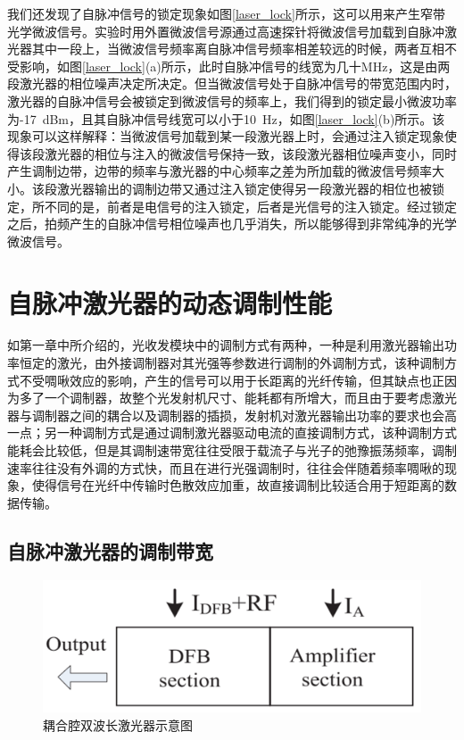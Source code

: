 我们还发现了自脉冲信号的锁定现象如图\ref{laser_lock}所示，这可以用来产生窄带光学微波信号。实验时用外置微波信号源通过高速探针将微波信号加载到自脉冲激光器其中一段上，当微波信号频率离自脉冲信号频率相差较远的时候，两者互相不受影响，如图\ref{laser_lock}(a)所示，此时自脉冲信号的线宽为几十MHz，这是由两段激光器的相位噪声决定所决定。但当微波信号处于自脉冲信号的带宽范围内时，激光器的自脉冲信号会被锁定到微波信号的频率上，我们得到的锁定最小微波功率为-17~dBm，且其自脉冲信号线宽可以小于10~Hz，如图\ref{laser_lock}(b)所示。该现象可以这样解释：当微波信号加载到某一段激光器上时，会通过注入锁定现象使得该段激光器的相位与注入的微波信号保持一致，该段激光器相位噪声变小，同时产生调制边带，边带的频率与激光器的中心频率之差为所加载的微波信号频率大小。该段激光器输出的调制边带又通过注入锁定使得另一段激光器的相位也被锁定，所不同的是，前者是电信号的注入锁定，后者是光信号的注入锁定。经过锁定之后，拍频产生的自脉冲信号相位噪声也几乎消失，所以能够得到非常纯净的光学微波信号。

\section{自脉冲激光器的动态调制性能}

如第一章中所介绍的，光收发模块中的调制方式有两种，一种是利用激光器输出功率恒定的激光，由外接调制器对其光强等参数进行调制的外调制方式，该种调制方式不受啁啾效应\cite{wakita1991observation}的影响，产生的信号可以用于长距离的光纤传输，但其缺点也正因为多了一个调制器，故整个光发射机尺寸、能耗都有所增大，而且由于要考虑激光器与调制器之间的耦合以及调制器的插损，发射机对激光器输出功率的要求也会高一点；另一种调制方式是通过调制激光器驱动电流的直接调制方式，该种调制方式能耗会比较低，但是其调制速带宽往往受限于载流子与光子的弛豫振荡频率，调制速率往往没有外调的方式快，而且在进行光强调制时，往往会伴随着频率啁啾的现象，使得信号在光纤中传输时色散效应加重，故直接调制比较适合用于短距离的数据传输。

\subsection{自脉冲激光器的调制带宽}

\begin{figure}[htb]
	\centering
	\includegraphics[width=13cm]{./Pictures/laser_ppr_structure.jpg}
	\captionsetup{justification=centering}
	\caption{耦合腔双波长激光器示意图\cite{wei2016realizing}}
	\label{laser_ppr_structure}
\end{figure}

